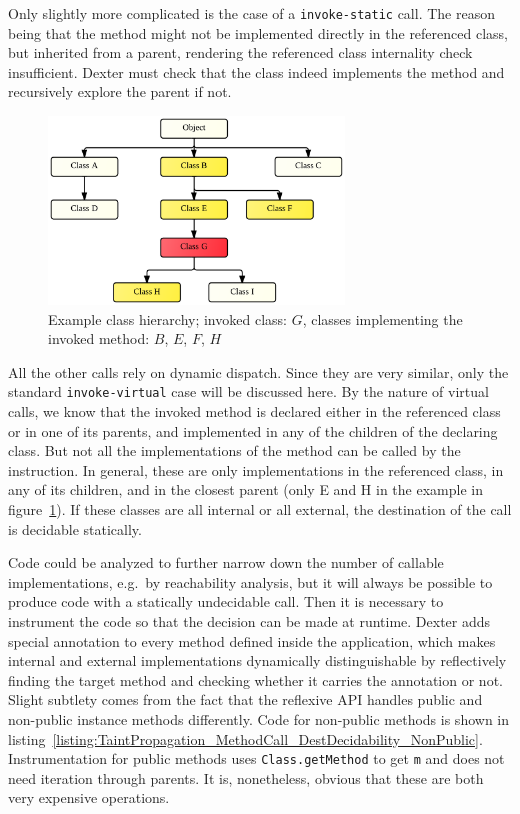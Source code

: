 \documentclass[12pt,twoside,notitlepage]{report}
\begin{document}
Only slightly more complicated is the case of a \verb$invoke-static$ call. The reason being that the method might not be implemented directly in the referenced class, but inherited from a parent, rendering the referenced class internality check insufficient. Dexter must check that the class indeed implements the method and recursively explore the parent if not.

\begin{figure}
	\centerline{	
		\includegraphics[width=0.7\textwidth]{figs/fig_virtual_call_tree.png}
	}
	\caption{Example class hierarchy; invoked class: $G$, classes implementing the invoked method: $B$, $E$, $F$, $H$}
	\label{fig:TaintPropagation_DestDecision_ClassHierarchy}
\end{figure}

All the other calls rely on dynamic dispatch. Since they are very similar, only the standard \verb$invoke-virtual$ case will be discussed here. By the nature of virtual calls, we know that the invoked method is declared either in the referenced class or in one of its parents, and implemented in any of the children of the declaring class. But not all the implementations of the method can be called by the instruction. In general, these are only implementations in the referenced class, in any of its children, and in the closest parent (only E and H in the example in figure~\ref{fig:TaintPropagation_DestDecision_ClassHierarchy}). If these classes are all internal or all external, the destination of the call is decidable statically. 

Code could be analyzed to further narrow down the number of callable implementations, e.g.\ by reachability analysis, but it will always be possible to produce code with a statically undecidable call. Then it is necessary to instrument the code so that the decision can be made at runtime. Dexter adds special annotation to every method defined inside the application, which makes internal and external implementations dynamically distinguishable by reflectively finding the target method and checking whether it carries the annotation or not. Slight subtlety comes from the fact that the reflexive API handles public and non-public instance methods differently. Code for non-public methods is shown in listing~\ref{listing:TaintPropagation_MethodCall_DestDecidability_NonPublic}. Instrumentation for public methods uses \verb$Class.getMethod$ to get \verb$m$ and does not need iteration through parents. It is, nonetheless, obvious that these are both very expensive operations. 
\end{document}
